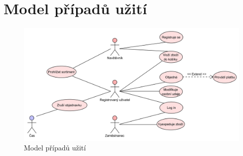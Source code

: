 \documentclass[12pt, a4paper]{article}
\begin{document}
\newpage
\section{Model případů užití}


 \begin{figure}[!ht]
    \centering
    \includegraphics[width=1\linewidth]{use_case_diagram.png}
    \caption{Model případů užití}
    \label{figure:ast_example1}
\end{figure}
\end{document}
